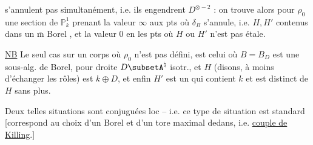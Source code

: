 s'annulent pas simultanément, i.e. ils engendrent $D^{\otimes-2}$ : on trouve alors pour $\rho_0$ une section de $\mathbb P^1_k$ prenant la valeur $\infty$ aux pts où $\delta_B$ s'annule,  i.e. $H,H'$ contenus dans un $\overline{\mathrm m}$ Borel , et la valeur $0$ en les pts où $H$ ou $H'$ n'est pas étale. 

\uline{NB} Le seul cas sur un corps où $\rho_0$ n'est pas défini, est celui où $B=B_D$ est une sous-alg. de Borel, pour droite $D\subsetA^{\natural}$  isotr., et $H$ (disons, à moins d'échanger les rôles) est $k\oplus D$, et enfin $H'$ est  un  qui contient $k$ et est distinct de $H$ sans plus.

 Deux telles situations sont conjuguées loc -- i.e. ce type de situation est standard [correspond au choix d'un Borel et d'un tore maximal dedans, i.e. \uline{couple de Killing}.]
